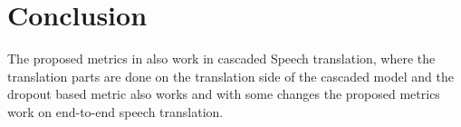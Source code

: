 
\chapter{Conclusion}
\label{ch:Conclusion}
The proposed metrics in \cite{fomicheva2020unsupervised} also work in cascaded Speech translation, where the translation parts are done on the translation side of the cascaded model and the dropout based metric also works and with some changes the proposed metrics work on end-to-end speech translation. 

